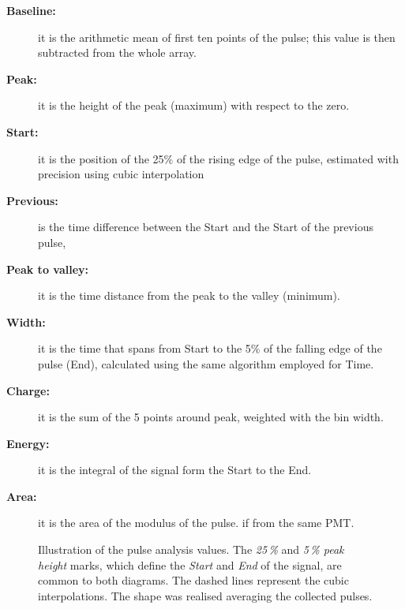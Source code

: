 \begin{description}
  \item[\bfseries Baseline:] it is the arithmetic mean of first ten points of the pulse; %
    this value is then subtracted from the whole array.
  \item[\bfseries Peak:] it is the height of the peak (maximum) with respect to the zero.
  \item[\bfseries Start:] it is the position of the 25\% of the rising edge of the pulse, estimated with %
    precision using cubic interpolation
  \item[\bfseries Previous:] is the time difference between the Start and the Start of the previous pulse, %
  \item[\bfseries Peak to valley:] it is the time distance from the peak to the valley (minimum).
  \item[\bfseries Width:] it is the time that spans from Start to the 5\% of the falling edge %
    of the pulse (End), calculated using the same algorithm employed for Time.
  \item[\bfseries Charge:] it is the sum of the 5 points around peak, weighted with the bin width.
  \item[\bfseries Energy:] it is the integral of the signal form the Start to the End.
  \item[\bfseries Area:] it is the area of the modulus of the pulse.
    if from the same PMT.
\end{description}

\begin{figure}
  \centering
  \def\svgwidth{0.47\textwidth}
   \qquad
  \def\svgwidth{0.47\textwidth}
  \caption{Illustration of the pulse analysis values. The \emph{25\,\%} and \emph{5\,\% peak height} marks, %
  which define the \emph{Start} and \emph{End} of the signal, are common to both diagrams. The dashed lines represent %
  the cubic interpolations.
  The shape was realised averaging the collected pulses.}
  \label{fig:pulseana}
\end{figure}


